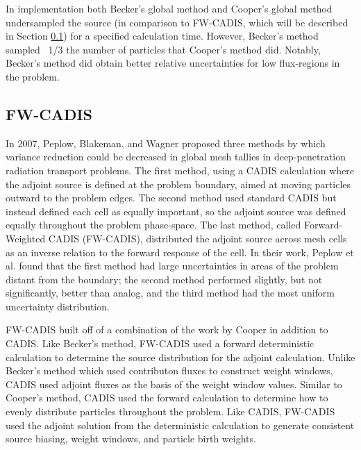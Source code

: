 In implementation both Becker's global method and Cooper's global method
undersampled the source (in comparison to FW-CADIS, which will be described in
Section \ref{subsec:FWCADIS}) for a specified calculation
time. However, Becker's method sampled ~1/3 the number of particles that
Cooper's method did. Notably, Becker's method did obtain better relative
uncertainties for low flux-regions in the problem.

\subsection{FW-CADIS}
\label{subsec:FWCADIS}

In 2007, Peplow, Blakeman, and Wagner \cite{peplow_advanced_2007} proposed three
methods by which variance reduction could be decreased in global mesh tallies in
deep-penetration radiation transport problems. The first method, using a CADIS
calculation where the adjoint source is defined at the problem boundary, aimed
at moving particles outward to the problem edges.
The second method used standard CADIS but instead
defined each cell as equally important, so the adjoint source was defined
equally throughout the problem phase-space. The last method, called Forward-Weighted
CADIS (FW-CADIS), distributed the adjoint source across mesh cells as an inverse
relation to the forward response of the cell. In their work, Peplow et al. found
that the first method had large uncertainties in areas of the problem distant
from the boundary; the second method performed slightly, but not significantly,
better than analog, and the third method had the most uniform uncertainty
distribution.

FW-CADIS
\cite{wagner_forward-weighted_2007,wagner_forward-weighted_2009,wagner_forward-weighted_2010}
built off of a combination of the work by Cooper in addition to CADIS.
Like Becker's method, FW-CADIS used a forward deterministic calculation to
determine the source distribution for the adjoint calculation. Unlike Becker's
method which used contributon fluxes to construct weight windows,
CADIS used adjoint fluxes as the basis of the weight window values. Similar to
Cooper's method, CADIS used the forward calculation to determine how to
evenly distribute particles throughout the problem. Like CADIS, FW-CADIS used
the adjoint solution from the deterministic calculation to generate consistent
source biasing, weight windows, and particle birth weights.

